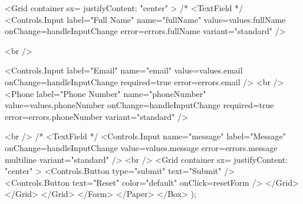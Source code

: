 {            <Grid container sx={{ justifyContent: "center" }}>
              {/* <TextField */}
              <Controls.Input
                label="Full Name"
                name="fullName"
                value={values.fullName}
                onChange={handleInputChange}
                error={errors.fullName}
                variant="standard"
              />

              <br />

              <Controls.Input
                label="Email"
                name="email"
                value={values.email}
                onChange={handleInputChange}
                required={true}
                error={errors.email}
              />
              <br />
              <Phone 
                label="Phone Number"
                name="phoneNumber"
                value={values.phoneNumber}
                onChange={handleInputChange}
                required={true}
                error={errors.phoneNumber}
                variant="standard"
              />

              <br />
              {/* <TextField */}
              <Controls.Input
                name="message"
                label="Message"
                onChange={handleInputChange}
                value={values.message}
                error={errors.message}
                multiline
                variant="standard"
              />
              <br />
              <Grid container sx={{ justifyContent: "center" }}>
                <Controls.Button type="submit" text="Submit" />
                <Controls.Button
                  text="Reset"
                  color="default"
                  onClick={resetForm}
                />
              </Grid>
            </Grid>
          </Grid>
        </Form>
      </Paper>
    </Box>
  );
}
